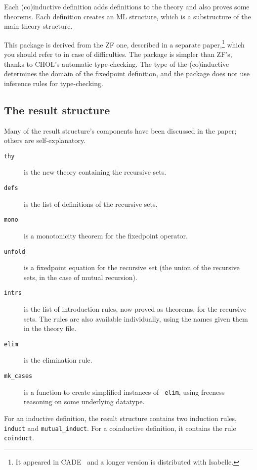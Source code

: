 Each (co)inductive definition adds definitions to the theory and also
proves some theorems.  Each definition creates an ML structure, which is a
substructure of the main theory structure.

This package is derived from the ZF one, described in a
separate paper,\footnote{It appeared in CADE~\cite{paulson-CADE} and a
  longer version is distributed with Isabelle.} which you should refer to
in case of difficulties.  The package is simpler than ZF's, thanks to CHOL's
automatic type-checking.  The type of the (co)inductive determines the
domain of the fixedpoint definition, and the package does not use inference
rules for type-checking.


\subsection{The result structure}
Many of the result structure's components have been discussed in the paper;
others are self-explanatory.
\begin{description}
\item[\tt thy] is the new theory containing the recursive sets.

\item[\tt defs] is the list of definitions of the recursive sets.

\item[\tt mono] is a monotonicity theorem for the fixedpoint operator.

\item[\tt unfold] is a fixedpoint equation for the recursive set (the union of
the recursive sets, in the case of mutual recursion).

\item[\tt intrs] is the list of introduction rules, now proved as theorems, for
the recursive sets.  The rules are also available individually, using the
names given them in the theory file. 

\item[\tt elim] is the elimination rule.

\item[\tt mk\_cases] is a function to create simplified instances of {\tt
elim}, using freeness reasoning on some underlying datatype.
\end{description}

For an inductive definition, the result structure contains two induction rules,
{\tt induct} and \verb|mutual_induct|.  For a coinductive definition, it
contains the rule \verb|coinduct|.


